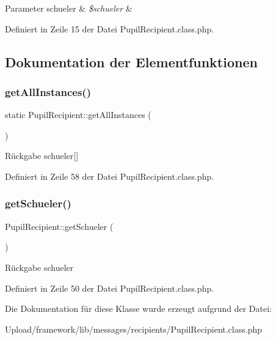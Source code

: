 \begin{DoxyParams}[1]{Parameter}
schueler & {\em \$schueler} & \\
\hline
\end{DoxyParams}


Definiert in Zeile 15 der Datei Pupil\+Recipient.\+class.\+php.



\subsection{Dokumentation der Elementfunktionen}
\mbox{\label{class_pupil_recipient_a70d785340a48ab40f2c3ca5743c48f3d}} 
\subsubsection{\texorpdfstring{get\+All\+Instances()}{getAllInstances()}}
{\footnotesize\ttfamily static Pupil\+Recipient\+::get\+All\+Instances (\begin{DoxyParamCaption}{ }\end{DoxyParamCaption})\hspace{0.3cm}{\ttfamily [static]}}

\begin{DoxyReturn}{Rückgabe}
schueler\mbox{[}\mbox{]} 
\end{DoxyReturn}


Definiert in Zeile 58 der Datei Pupil\+Recipient.\+class.\+php.

\mbox{\label{class_pupil_recipient_ab7337229a1ecc5640d13a511259972f8}} 
\subsubsection{\texorpdfstring{get\+Schueler()}{getSchueler()}}
{\footnotesize\ttfamily Pupil\+Recipient\+::get\+Schueler (\begin{DoxyParamCaption}{ }\end{DoxyParamCaption})}

\begin{DoxyReturn}{Rückgabe}
schueler 
\end{DoxyReturn}


Definiert in Zeile 50 der Datei Pupil\+Recipient.\+class.\+php.



Die Dokumentation für diese Klasse wurde erzeugt aufgrund der Datei\+:\begin{DoxyCompactItemize}
\item 
Upload/framework/lib/messages/recipients/Pupil\+Recipient.\+class.\+php\end{DoxyCompactItemize}
